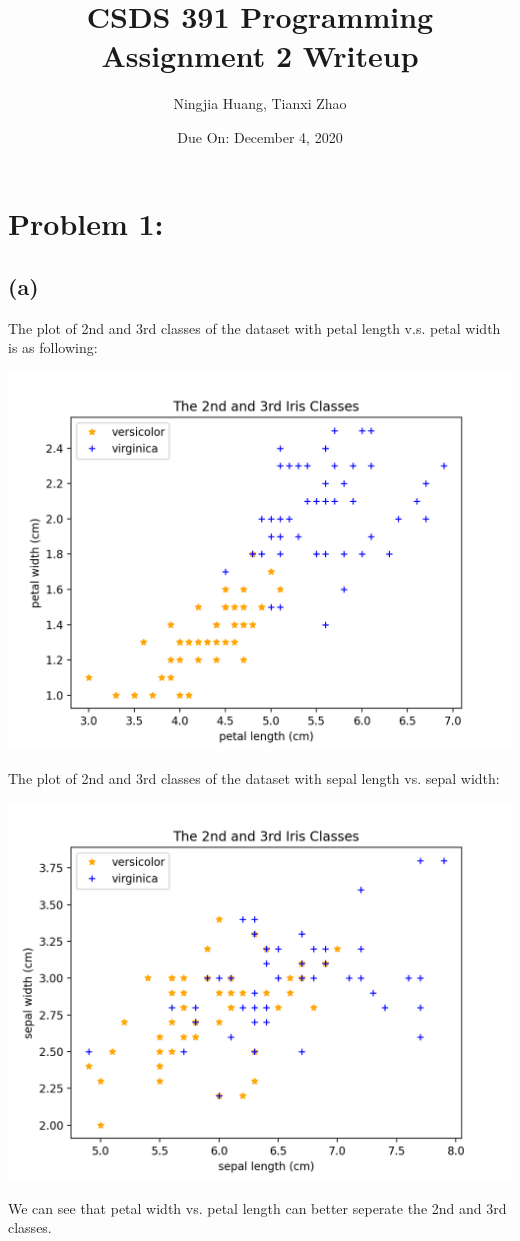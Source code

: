 \documentclass[12pt]{article}
\begin{document}
\title{CSDS 391 Programming Assignment 2 Writeup}
\author{Ningjia Huang, Tianxi Zhao}
\date{Due On: December 4, 2020}
\maketitle

\section*{Problem 1: }
\subsection*{(a)}
The plot of 2nd and 3rd classes of the dataset with petal length v.s. petal width is as following:
\begin{center}
    \includegraphics[scale=0.50]{fig/ai1a}
\end{center}
The plot of 2nd and 3rd classes of the dataset with sepal length vs. sepal width:
\begin{center}
    \includegraphics[scale=0.50]{fig/ai1a2}
\end{center}
We can see that petal width vs. petal length can better seperate the 2nd and 3rd classes.
\end{document}
